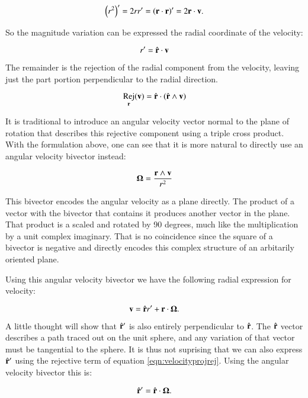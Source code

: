 \documentclass{article}      %
\newcommand{\BOmega}[0]{\boldsymbol{\Omega}}
\DeclareMathOperator{\Rej}{Rej}
\begin{document}
\[
\left(r^2\right)' = 2 r r' = \left(\mathbf{r} \cdot \mathbf{r}\right)' = 2 \mathbf{r} \cdot \mathbf{v}.
\]

So the magnitude variation can be expressed the radial coordinate of the velocity:

\begin{equation}\label{eqn:rprime}
r' = \hat{\mathbf{r}} \cdot \mathbf{v}
\end{equation}

The remainder is the rejection of the radial component from the velocity, leaving just the part
portion perpendicular to the radial direction.

\[
\Rej_{\Br}(\Bv) = \rcap \cdot \left(\rcap \wedge \Bv\right)
\]

It is traditional to introduce an angular velocity vector normal to the plane of rotation
that describes this rejective component using a triple cross product.  With the formulation above, 
one can see that it is more natural to directly use an angular velocity bivector instead:

\begin{equation}
\BOmega = \frac{\Br \wedge \Bv}{r^2}
\end{equation}

This bivector encodes the
angular velocity as a plane directly.  The
product of a vector with the bivector that contains it produces another vector
in the plane.  That product is a scaled and rotated by 90 degrees, much like the
multiplication by a unit complex imaginary.  That is no coincidence since
the square of a bivector is negative and directly encodes this complex structure
of an arbitarily oriented plane.

Using this angular velocity bivector we have the following radial expression for velocity:

\begin{equation}\label{eqn:velocityomega}
\Bv = \rcap r' + \Br \cdot \BOmega.
\end{equation}

A little thought will show that $\hat{\mathbf{r}}'$ is also entirely perpendicular to $\hat{\mathbf{r}}$.  The $\hat{\mathbf{r}}$ vector describes
a path traced out on the unit sphere, and any variation of that vector must be tangential to the sphere.
It is thus not suprising that we can also express $\hat{\mathbf{r}}'$ using the rejective term of equation
\ref{eqn:velocityprojrej}.  Using the angular velocity bivector this is:

\begin{equation}\label{eqn:rcapprime}
\rcap' = \rcap \cdot \BOmega.
\end{equation}
\end{document}
